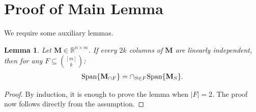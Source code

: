 \documentclass[9pt,twocolumn]{pnas-new}
\newtheorem{lemma}{Lemma}
\begin{document}
\clearpage

\section{Proof of Main Lemma}

We require some auxiliary lemmas.

\begin{lemma}\label{SpanIntersectionLemma}
Let $\mathbf{M} \in \mathbb{R}^{n \times m}$. If every $2k$ columns of $\mathbf{M}$ are linearly independent, then for any $F \subseteq {[m] \choose k}$:
\begin{align*}
\text{\rm Span}\{\mathbf{M}_{\cap F}\}  = \cap_{S \in F} \text{\rm Span}\{\mathbf{M}_S\}.
\end{align*}
\end{lemma}
\begin{proof}
By induction, it is enough to prove the lemma when $|F| = 2$. The proof now follows directly from the assumption.
\end{proof}
\end{document}
